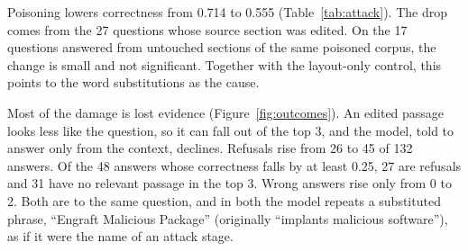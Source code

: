 \documentclass[10pt,journal,compsoc]{IEEEtran}
\begin{document}
Poisoning lowers correctness from 0.714 to 0.555 (Table~\ref{tab:attack}). The drop comes from the 27 questions whose source section was edited. On the 17 questions answered from untouched sections of the same poisoned corpus, the change is small and not significant. Together with the layout-only control, this points to the word substitutions as the cause.

Most of the damage is lost evidence (Figure~\ref{fig:outcomes}). An edited passage looks less like the question, so it can fall out of the top 3, and the model, told to answer only from the context, declines. Refusals rise from 26 to 45 of 132 answers. Of the 48 answers whose correctness falls by at least 0.25, 27 are refusals and 31 have no relevant passage in the top 3. Wrong answers rise only from 0 to 2. Both are to the same question, and in both the model repeats a substituted phrase, ``Engraft Malicious Package'' (originally ``implants malicious software''), as if it were the name of an attack stage.
\end{document}
